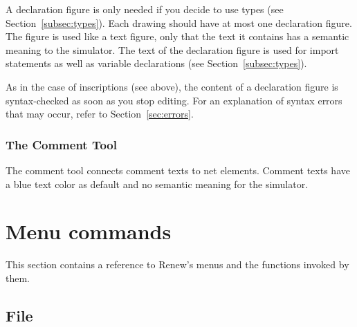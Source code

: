 A declaration figure is only needed if you decide to use types
(see Section~\ref{subsec:types}).
Each drawing should have at most one declaration figure.
The figure is used like a text figure, only that the text it contains
has a semantic meaning to the simulator.
The text of the declaration figure is used for import statements
as well as variable declarations (see Section~\ref{subsec:types}).

As in the case of inscriptions (see above), the content of a
declaration figure is syntax-checked as soon as you stop editing.
For an explanation of syntax errors that may occur, refer to
Section~\ref{sec:errors}.

\subsubsection{The Comment Tool}

The comment tool connects comment texts to net elements. 
Comment texts have a blue text color as default and no semantic meaning for the simulator. 


%
%


\section{Menu commands}
\label{sec:menuCommands}

This section contains a reference to Renew's menus and the
functions invoked by them.

\subsection{File}

